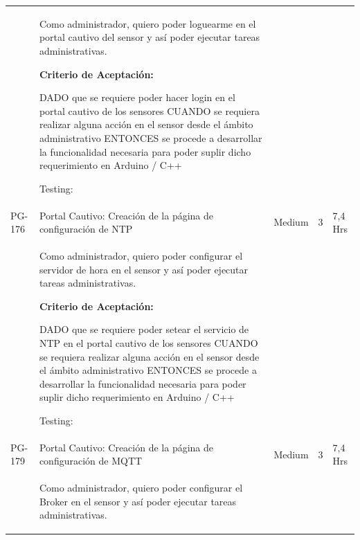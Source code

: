 \documentclass[11pt]{charter}
\begin{document}
\begin{landscape}
\begin{tabularx}{\linewidth}{@{}|p{1.3cm}|p{17cm}|p{1.7cm}|p{1.5cm}|p{1.7cm}|@{}}
         &  \begin{description}                 
                   \item Como administrador, quiero poder   loguearme en el portal cautivo del sensor y así poder ejecutar tareas   administrativas.                 
                   \item \textbf{Criterio de Aceptación:}                 
                   \item DADO que se requiere poder hacer login en el portal cautivo de los sensores CUANDO se requiera realizar alguna acción en el sensor desde el ámbito   administrativo ENTONCES se procede a desarrollar la funcionalidad necesaria para poder   suplir dicho requerimiento en Arduino / C++                
                   \item Testing:
            \end{description}            &  &     & \\
PG-176   & Portal Cautivo: Creación de la   página de configuración de NTP    & Medium             & 3   & 7,4  Hrs          \\
         &  \begin{description}                 
                   \item Como administrador, quiero poder   configurar el servidor de hora en el sensor y así poder ejecutar tareas   administrativas.                 
                   \item \textbf{Criterio de Aceptación:}                 
                   \item DADO que se requiere poder setear el servicio de NTP en el portal cautivo   de los sensores CUANDO se requiera realizar alguna acción en el sensor desde el ámbito   administrativo ENTONCES se procede a desarrollar la funcionalidad necesaria para poder   suplir dicho requerimiento en Arduino / C++                
                   \item Testing:
            \end{description}           &  &     & \\
PG-179   & Portal Cautivo: Creación de la   página de configuración de MQTT   & Medium             & 3   & 7,4  Hrs          \\
         &  \begin{description}                 
                   \item Como administrador, quiero poder   configurar el Broker en el sensor y así poder ejecutar tareas   administrativas.                 

\end{description}
\end{tabularx}
\end{landscape}
\end{document}
